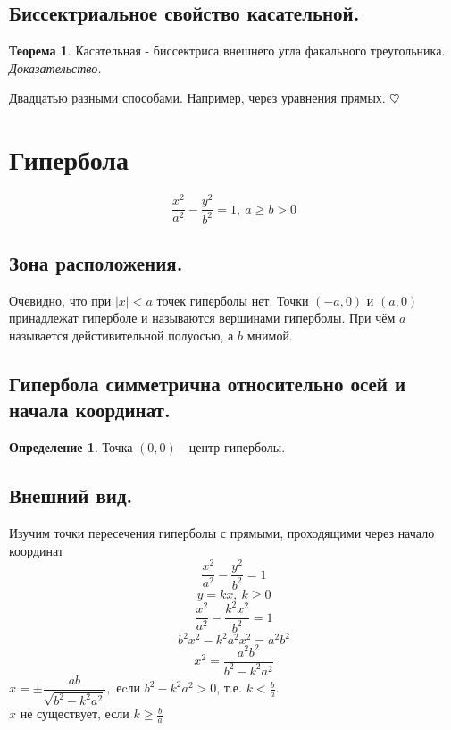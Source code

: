 \documentclass{article}
\theoremstyle{definition}
\newtheorem{definition}{Определение}
\newtheorem{theorem}{Теорема}[section]
\newenvironment{ourproof}{\textit{\\ Доказательство.\\ }}{$\hfill \heartsuit$}
\begin{document}
\subsection{Биссектриальное свойство касательной.}
\begin{theorem}

Касательная - биссектриса внешнего угла факального треугольника.
\begin{ourproof}{}

Двадцатью разными способами. Например, через уравнения прямых. 
\end{ourproof}
\end{theorem} 


\section{Гипербола}

$$\frac{x^2}{a^2} - \frac{y^2}{b^2} = 1, \ a \geqslant b > 0 $$

\subsection{Зона расположения.}
Очевидно, что при $|x| < a$ точек гиперболы нет. 
Точки $(-a, 0)$ и $(a, 0)$ принадлежат гиперболе и называются вершинами гиперболы. При чём $a$ называется дейстивительной полуосью, а $b$ мнимой.

\subsection{Гипербола симметрична относительно осей и начала координат.}
\begin{definition}
Точка $(0, 0)$ - центр гиперболы.
\end{definition}

\subsection{Внешний вид.}

Изучим точки пересечения гиперболы с прямыми, проходящими через начало координат
$$\frac{x^2}{a^2} - \frac{y^2}{b^2} = 1 $$
$$y = k x, \ k \geqslant 0 $$
$$\frac{x^2}{a^2} - \frac{k^ 2 x^ 2}{b ^ 2} = 1 $$
$$b^2 x^2 - k^2 a^2 x^2 = a^2 b^2 $$
$$x^2 = \frac{a^2 b^2}{b^2 - k^2 a^2} $$
$x = \pm \dfrac{a b}{\sqrt{b^2 - k^2 a^2}},$ еcли $b^2 - k^2 a^2 > 0$, т.е. $k < \frac{b}{a}$. \\ $x$ не существует, если $k \geqslant \frac{b}{a} $
\end{document}
